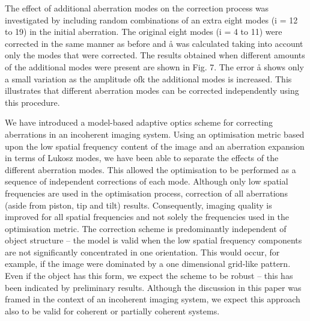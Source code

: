The effect of additional aberration modes on the correction process was investigated by including random combinations of an extra eight modes (i = 12 to 19) in the initial aberration. The original eight modes (i = 4 to 11) were corrected in the same manner as before and å was calculated taking into account only the modes that were corrected. The results obtained when different amounts of the additional modes were present are shown in Fig. 7. The error å shows only a small variation as the amplitude ofk the additional modes is increased. This illustrates that different aberration modes can be corrected independently using this procedure.

We have introduced a model-based adaptive optics scheme for correcting aberrations in an incoherent imaging system. Using an optimisation metric based upon the low spatial frequency content of the image and an aberration expansion in terms of Lukosz modes, we have been able to separate the effects of the different aberration modes. This allowed the optimisation to be performed as a sequence of independent corrections of each mode. Although only low spatial frequencies are used in the optimisation process, correction of all aberrations (aside from piston, tip and tilt) results. Consequently, imaging quality is improved for all spatial frequencies and not solely the frequencies used in the optimisation metric. The correction scheme is predominantly independent of object structure – the model is valid when the low spatial frequency components are not significantly concentrated in one orientation. This would occur, for example, if the image were dominated by a one dimensional grid-like pattern. Even if the object has this form, we expect the scheme to be robust – this has been indicated by preliminary results. Although the discussion in this paper was framed in the context of an incoherent imaging system, we expect this approach also to be valid for coherent or partially coherent systems.
 

